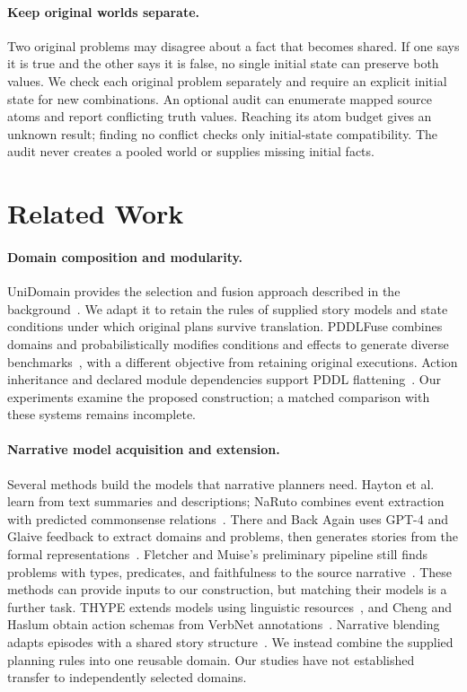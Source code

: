 \documentclass[letterpaper]{article}
\begin{document}
\paragraph{Keep original worlds separate.}
Two original problems may disagree about a fact that becomes shared. If one says it is true and the other says it is false, no single initial state can preserve both values. We check each original problem separately and require an explicit initial state for new combinations. An optional audit can enumerate mapped source atoms and report conflicting truth values. Reaching its atom budget gives an unknown result; finding no conflict checks only initial-state compatibility. The audit never creates a pooled world or supplies missing initial facts.



\section{Related Work}
\paragraph{Domain composition and modularity.}
UniDomain provides the selection and fusion approach described in the background~\cite{ye2025unidomain}. We adapt it to retain the rules of supplied story models and state conditions under which original plans survive translation. PDDLFuse combines domains and probabilistically modifies conditions and effects to generate diverse benchmarks~\cite{khandelwal2025pddlfuse}, with a different objective from retaining original executions. Action inheritance and declared module dependencies support PDDL flattening~\cite{lindsay2023modularity}. Our experiments examine the proposed construction; a matched comparison with these systems remains incomplete.

\paragraph{Narrative model acquisition and extension.}
Several methods build the models that narrative planners need. Hayton et al.~\cite{hayton2020acquisition} learn from text summaries and descriptions; NaRuto combines event extraction with predicted commonsense relations~\cite{li2024naruto}. There and Back Again uses GPT-4 and Glaive feedback to extract domains and problems, then generates stories from the formal representations~\cite{kelly2023there}. Fletcher and Muise's preliminary pipeline still finds problems with types, predicates, and faithfulness to the source narrative~\cite{fletcher2026synthesis}. These methods can provide inputs to our construction, but matching their models is a further task. THYPE extends models using linguistic resources~\cite{porteous2020thype,porteous2021extension}, and Cheng and Haslum obtain action schemas from VerbNet annotations~\cite{cheng2025verbnet}. Narrative blending adapts episodes with a shared story structure~\cite{lima2021blending}. We instead combine the supplied planning rules into one reusable domain. Our studies have not established transfer to independently selected domains.
\end{document}
